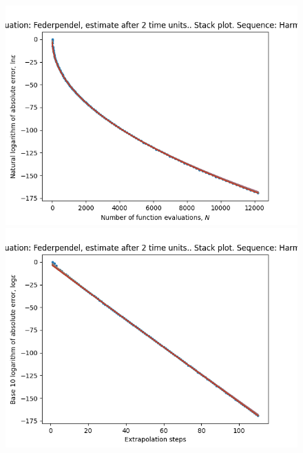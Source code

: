 \begin{figure}[H]
\centering
\begin{minipage}{0.45\textwidth}
\centering
\includegraphics[scale=0.45]{../results/emr_plots/federpendel_2_hp_harmonic_stack.png}
\end{minipage}
\begin{minipage}{0.45\textwidth}
\centering
\includegraphics[scale=0.45]{../results/emr_plots/federpendel_2_hp_harmonic_steps_stack.png}
\end{minipage}
\end{figure}

